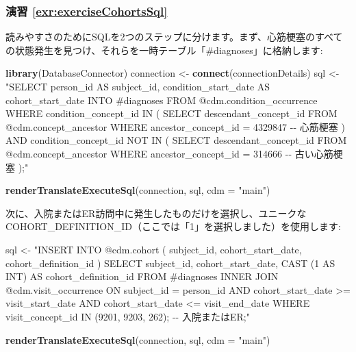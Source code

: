 \documentclass[
  11pt]{book}
\newenvironment{Shaded}{\begin{snugshade}}{\end{snugshade}}
\newcommand{\AttributeTok}[1]{\textcolor[rgb]{0.13,0.29,0.53}{#1}}
\newcommand{\FunctionTok}[1]{\textcolor[rgb]{0.13,0.29,0.53}{\textbf{#1}}}
\newcommand{\NormalTok}[1]{#1}
\newcommand{\OtherTok}[1]{\textcolor[rgb]{0.56,0.35,0.01}{#1}}
\newcommand{\StringTok}[1]{\textcolor[rgb]{0.31,0.60,0.02}{#1}}
\theoremstyle{definition}
\theoremstyle{definition}
\theoremstyle{definition}
\theoremstyle{definition}
\theoremstyle{remark}
\begin{document}
\subsubsection*{演習 \ref{exr:exerciseCohortsSql}}\label{ux6f14ux7fd2-refexrexercisecohortssql}

読みやすさのためにSQLを2つのステップに分けます。まず、心筋梗塞のすべての状態発生を見つけ、それらを一時テーブル「\#diagnoses」に格納します:

\begin{Shaded}
\begin{Highlighting}[]
\FunctionTok{library}\NormalTok{(DatabaseConnector)}
\NormalTok{connection }\OtherTok{\textless{}{-}} \FunctionTok{connect}\NormalTok{(connectionDetails)}
\NormalTok{sql }\OtherTok{\textless{}{-}} \StringTok{"SELECT person\_id AS subject\_id,}
\StringTok{  condition\_start\_date AS cohort\_start\_date}
\StringTok{INTO \#diagnoses}
\StringTok{FROM @cdm.condition\_occurrence}
\StringTok{WHERE condition\_concept\_id IN (}
\StringTok{    SELECT descendant\_concept\_id}
\StringTok{    FROM @cdm.concept\_ancestor}
\StringTok{    WHERE ancestor\_concept\_id = 4329847 {-}{-} 心筋梗塞}
\StringTok{)}
\StringTok{  AND condition\_concept\_id NOT IN (}
\StringTok{    SELECT descendant\_concept\_id}
\StringTok{    FROM @cdm.concept\_ancestor}
\StringTok{    WHERE ancestor\_concept\_id = 314666 {-}{-} 古い心筋梗塞}
\StringTok{);"}

\FunctionTok{renderTranslateExecuteSql}\NormalTok{(connection, sql, }\AttributeTok{cdm =} \StringTok{"main"}\NormalTok{)}
\end{Highlighting}
\end{Shaded}

次に、入院またはER訪問中に発生したものだけを選択し、ユニークなCOHORT\_DEFINITION\_ID（ここでは「1」を選択しました）を使用します:

\begin{Shaded}
\begin{Highlighting}[]
\NormalTok{sql }\OtherTok{\textless{}{-}} \StringTok{"INSERT INTO @cdm.cohort (}
\StringTok{  subject\_id,}
\StringTok{  cohort\_start\_date,}
\StringTok{  cohort\_definition\_id}
\StringTok{  )}
\StringTok{SELECT subject\_id,}
\StringTok{  cohort\_start\_date,}
\StringTok{  CAST (1 AS INT) AS cohort\_definition\_id}
\StringTok{FROM \#diagnoses}
\StringTok{INNER JOIN @cdm.visit\_occurrence}
\StringTok{  ON subject\_id = person\_id}
\StringTok{    AND cohort\_start\_date \textgreater{}= visit\_start\_date}
\StringTok{    AND cohort\_start\_date \textless{}= visit\_end\_date}
\StringTok{WHERE visit\_concept\_id IN (9201, 9203, 262); {-}{-} 入院またはER;"}

\FunctionTok{renderTranslateExecuteSql}\NormalTok{(connection, sql, }\AttributeTok{cdm =} \StringTok{"main"}\NormalTok{)}
\end{Highlighting}
\end{Shaded}
\end{document}

